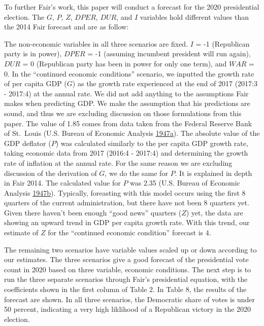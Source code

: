 \documentclass[11,]{article}
\begin{document}
To further Fair's work, this paper will conduct a forecast for the 2020
presidential election. The \(G\), \(P\), \(Z\), \(DPER\), \(DUR\), and
\(I\) variables hold different values than the 2014 Fair forecast and
are as follow:

The non-economic variables in all three scenarios are fixed. \(I\) = -1
(Republican party is in power), \(DPER\) = -1 (assuming incumbent
president will run again), \(DUR\) = 0 (Republican party has been in
power for only one term), and \(WAR\) = 0. In the ``continued economic
conditions'' scenario, we inputted the growth rate of per capita GDP
(\(G\)) as the growth rate experienced at the end of 2017 (2017:3 -
2017:4) at the annual rate. We did not add anything to the assumptions
Fair makes when predicting GDP. We make the assumption that his
predictions are sound, and thus we are excluding discussion on those
formulations from this paper. The value of 1.85 comes from data taken
from the Federal Reserve Bank of St.~Louis (U.S. Bureau of Economic
Analysis
\protect\hyperlink{ref-FRED_1947}{1947}\protect\hyperlink{ref-FRED_1947}{a}).
The absolute value of the GDP deflator (\(P\)) was calculated similarly
to the per capita GDP growth rate, taking economic data from 2017
(2016:4 - 2017:4) and determining the growth rate of inflation at the
annual rate. For the same reason we are excluding discussion of the
derivation of \(G\), we do the same for \(P\). It is explained in depth
in Fair 2014. The calculated value for \(P\) was 2.35 (U.S. Bureau of
Economic Analysis
\protect\hyperlink{ref-us_bureau_of_economic_analysis_gross_1947}{1947}\protect\hyperlink{ref-us_bureau_of_economic_analysis_gross_1947}{b}).
Typically, foreasting with this model occurs using the first 8 quarters
of the current administration, but there have not been 8 quarters yet.
Given there haven't been enough ``good news'' quarters (\(Z\)) yet, the
data are showing an upward trend in GDP per capita growth rate. With
this trend, our estimate of \(Z\) for the ``continued economic
condition'' forecast is 4.

The remaining two scenarios have variable values scaled up or down
according to our estimates. The three scenarios give a good forecast of
the presidential vote count in 2020 based on three variable, economic
conditions. The next step is to run the three separate scenarios through
Fair's presidential equation, with the coefficients shown in the first
column of Table 2. In Table 8, the results of the forecast are shown. In
all three scenarios, the Democratic share of votes is under 50 percent,
indicating a very high liklihood of a Republican victory in the 2020
election.
\end{document}
